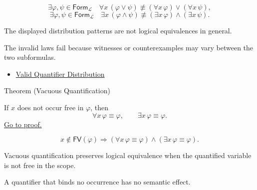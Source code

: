 \begin{remark*}
\[
\exists \varphi,\psi\in\mathsf{Form}_{\mathcal L}\quad
\forall x\,(\varphi\lor\psi)
\not\equiv
(\forall x\,\varphi)\lor(\forall x\,\psi),
\]
\[
\exists \varphi,\psi\in\mathsf{Form}_{\mathcal L}\quad
\exists x\,(\varphi\land\psi)
\not\equiv
(\exists x\,\varphi)\land(\exists x\,\psi).
\]
\end{remark*}

\begin{remark*}
The displayed distribution patterns are not logical equivalences in general.
\end{remark*}

\begin{remark*}[Interpretation]
The invalid laws fail because witnesses or counterexamples may vary between
the two subformulas.
\end{remark*}

\begin{dependencies}
\begin{itemize}
  \item \hyperref[thm:qdist]{Valid Quantifier Distribution}
\end{itemize}
\end{dependencies}

\begin{theorembox}{Theorem (Vacuous Quantification)}
\begin{theorem}
\label{thm:vacuous}
If \(x\) does not occur free in \(\varphi\), then
\[
\forall x\,\varphi\equiv\varphi,
\qquad
\exists x\,\varphi\equiv\varphi.
\]
\hyperref[prf:vacuous]{Go to proof.}
\end{theorem}
\end{theorembox}

\begin{remark*}
\[
x\notin\mathsf{FV}(\varphi)
\Rightarrow
(\forall x\,\varphi\equiv\varphi)
\land
(\exists x\,\varphi\equiv\varphi).
\]
\end{remark*}

\begin{remark*}
Vacuous quantification preserves logical equivalence when the quantified
variable is not free in the scope.
\end{remark*}

\begin{remark*}[Interpretation]
A quantifier that binds no occurrence has no semantic effect.
\end{remark*}

